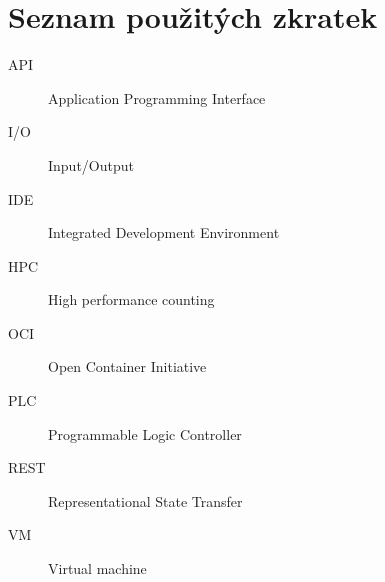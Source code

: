 \chapter{Seznam použitých zkratek}
\begin{description}
	\item[API] Application Programming Interface
	\item[I/O] Input/Output
	\item[IDE] Integrated Development Environment 
	\item[HPC] High performance counting
	\item[OCI] Open Container Initiative
	\item[PLC] Programmable Logic Controller
	\item[REST] Representational State Transfer
	\item[VM] Virtual machine
\end{description}
